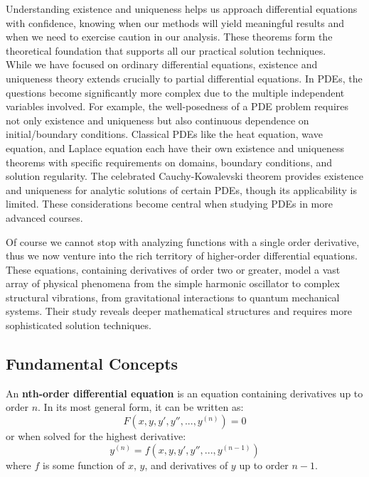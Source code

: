 \noindent Understanding existence and uniqueness helps us approach differential equations with confidence, knowing when our methods will yield meaningful results and when we need to exercise caution in our analysis. These theorems form the theoretical foundation that supports all our practical solution techniques. \\

\noindent While we have focused on ordinary differential equations, existence and uniqueness theory extends crucially to partial differential equations. In PDEs, the questions become significantly more complex due to the multiple independent variables involved. For example, the well-posedness of a PDE problem requires not only existence and uniqueness but also continuous dependence on initial/boundary conditions. Classical PDEs like the heat equation, wave equation, and Laplace equation each have their own existence and uniqueness theorems with specific requirements on domains, boundary conditions, and solution regularity. The celebrated Cauchy-Kowalevski theorem provides existence and uniqueness for analytic solutions of certain PDEs, though its applicability is limited. These considerations become central when studying PDEs in more advanced courses.
\newpage

 

\noindent Of course we cannot stop with analyzing functions with a single order derivative, thus we now venture into the rich territory of higher-order differential equations. These equations, containing derivatives of order two or greater, model a vast array of physical phenomena from the simple harmonic oscillator to complex structural vibrations, from gravitational interactions to quantum mechanical systems. Their study reveals deeper mathematical structures and requires more sophisticated solution techniques.

\subsection*{Fundamental Concepts} 

\noindent An \textbf{nth-order differential equation} is an equation containing derivatives up to order $n$. In its most general form, it can be written as:
\[
F(x, y, y', y'', ..., y^{(n)}) = 0
\]
or when solved for the highest derivative:
\[
y^{(n)} = f(x, y, y', y'', ..., y^{(n-1)})
\]
where $f$ is some function of $x$, $y$, and derivatives of $y$ up to order $n-1$. \\

